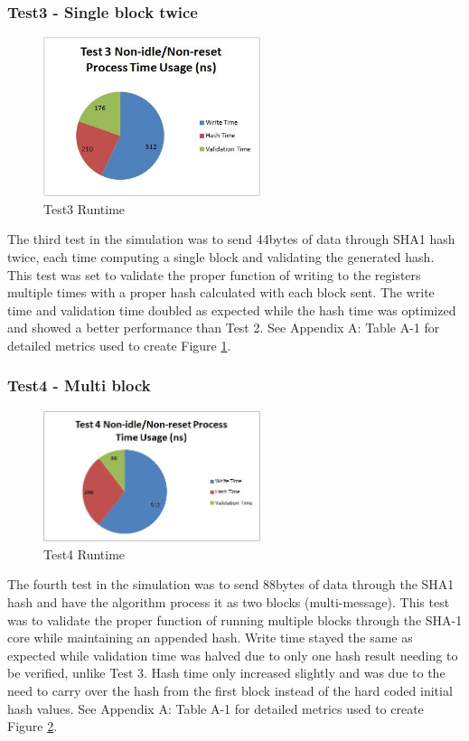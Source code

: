 \documentclass[journal]{IEEEtran}
\begin{document}
\subsubsection{Test3 - Single block twice}
\begin{figure}[ht]
\centering
\includegraphics[width=2.5in]{Test3.jpg}
\caption{Test3 Runtime}
\label{fig_test3Runtime}
\end{figure}
The third test in the simulation was to send 44bytes of data through SHA1 hash twice, each time computing a single block and validating the generated hash.  This test was set to validate the proper function of writing to the registers multiple times with a proper hash calculated with each block sent.  The write time and validation time doubled as expected while the hash time was optimized and showed a better performance than Test 2.  See Appendix A: Table A-1 for detailed metrics used to create Figure \ref{fig_test3Runtime}. 
\subsubsection{Test4 - Multi block}
\begin{figure}[ht]
\centering
\includegraphics[width=2.5in]{Test4.jpg}
\caption{Test4 Runtime}
\label{fig_test4Runtime}
\end{figure} 
The fourth test in the simulation was to send 88bytes of data through the SHA1 hash and have the algorithm process it as two blocks (multi-message).  This test was to validate the proper function of running multiple blocks through the SHA-1 core while maintaining an appended hash.  Write time stayed the same as expected while validation time was halved due to only one hash result needing to be verified, unlike Test 3.  Hash time only increased slightly and was due to the need to carry over the hash from the first block instead of the hard coded initial hash values.  See Appendix A: Table A-1 for detailed metrics used to create Figure \ref{fig_test4Runtime}.
\end{document}
